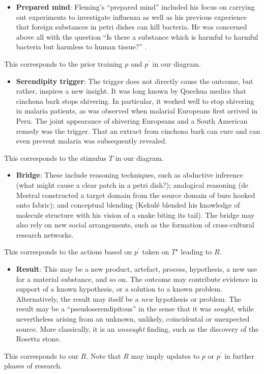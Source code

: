 \begin{itemize}
\item \textbf{Prepared mind}: 
Fleming's ``prepared mind'' included his focus
on carrying out experiments to investigate influenza as well as his
previous experience that foreign substances in petri dishes can kill
bacteria.  He was concerned above all with the question ``Is there a
substance which is harmful to harmful bacteria but harmless to human
tissue?''  \cite[p. 161]{roberts}.
\end{itemize}
%
This corresponds to the prior training $p$ and $p^{\prime}$ in our diagram.

\begin{itemize}
\item \textbf{Serendipity trigger}: The trigger does not directly
  cause the outcome, but rather, inspires a new insight.  It was long
  known by Quechua medics that cinchona bark stops shivering.  In
  particular, it worked well to stop shivering in malaria patients, as
  was observed when malarial Europeans first arrived in Peru.  The
  joint appearance of shivering Europeans and a South American remedy
  was the trigger.  That an extract from cinchona bark can cure and
  can even prevent malaria was subsequently revealed.
\end{itemize}
%
This corresponds to the stimulus $T$ in our diagram.
\begin{itemize}
\item \textbf{Bridge}: These include reasoning techniques, such as
  abductive inference (what might cause a clear patch in a petri
  dish?); analogical reasoning (de Mestral constructed a target domain
  from the source domain of burs hooked onto fabric); and conceptual
  blending (Kekul\'e blended his knowledge of molecule structure with
  his vision of a snake biting its tail).  The bridge may also rely on
  new social arrangements, such as the formation of cross-cultural
  research networks.
\end{itemize}
%
This corresponds to the actions based on $p^{\prime}$ taken on
$T^\star$ leading to $R$.
\begin{itemize}
\item \textbf{Result}: This may be a new product, artefact, process,
  hypothesis, a new use for a material substance, and so on.  The
  outcome may contribute evidence in support of a known hypothesis, or
  a solution to a known problem.  Alternatively, the result may itself
  be a {\em new} hypothesis or problem.  The result may be a
  ``pseudoserendipitous'' in the sense that it was {\em sought}, while
  nevertheless arising from an unknown, unlikely, coincidental or
  unexpected source.  More classically, it is an \emph{unsought}
  finding, such as the discovery of the Rosetta stone.
\end{itemize}
%
This corresponds to our $R$.  Note that $R$ may imply
  updates to $p$ or $p^{\prime}$ in further phases of research.


